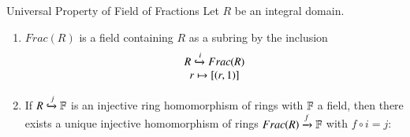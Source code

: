 \documentclass[12pt, a4paper, twoside, openright, titlepage]{book}
\begin{document}
\begin{namthm}{Universal Property of Field of Fractions}{}
    Let $R$ be an integral domain.
    \begin{enumerate}
        \item $Frac(R)$ is a field containing $R$ as a subring by the inclusion \begin{equation}
            \begin{array}{c} R\xhookrightarrow{i} Frac(R) \\ r\mapsto [(r,1)] \end{array}
        \end{equation}
        \item If $R \xhookrightarrow{j} \mathbb F$ is an injective ring homomorphism of rings with $\mathbb F$ a field, then there exists a unique injective homomorphism of rings $Frac(R) \xrightarrow{f}\mathbb F$ with $f \circ i = j$:
        \begin{center}
        \end{center}
    \end{enumerate}
\end{namthm}
\end{document}
